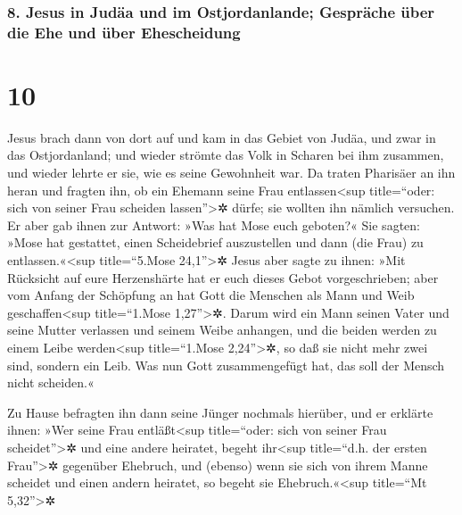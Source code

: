 \hypertarget{jesus-in-juduxe4a-und-im-ostjordanlande-gespruxe4che-uxfcber-die-ehe-und-uxfcber-ehescheidung}{%
\subsubsection{8. Jesus in Judäa und im Ostjordanlande; Gespräche über
die Ehe und über
Ehescheidung}\label{jesus-in-juduxe4a-und-im-ostjordanlande-gespruxe4che-uxfcber-die-ehe-und-uxfcber-ehescheidung}}

\hypertarget{section-9}{%
\section{10}\label{section-9}}

 Jesus brach dann von dort auf und kam in das Gebiet von
Judäa, und zwar in das Ostjordanland; und wieder strömte das Volk in
Scharen bei ihm zusammen, und wieder lehrte er sie, wie es seine
Gewohnheit war.  Da traten Pharisäer an ihn heran und
fragten ihn, ob ein Ehemann seine Frau entlassen\textless sup
title=``oder: sich von seiner Frau scheiden lassen''\textgreater✲ dürfe;
sie wollten ihn nämlich versuchen.  Er aber gab ihnen zur
Antwort: »Was hat Mose euch geboten?«  Sie sagten: »Mose
hat gestattet, einen Scheidebrief auszustellen und dann (die Frau) zu
entlassen.«\textless sup title=``5.Mose 24,1''\textgreater✲
 Jesus aber sagte zu ihnen: »Mit Rücksicht auf eure
Herzenshärte hat er euch dieses Gebot vorgeschrieben; 
aber vom Anfang der Schöpfung an hat Gott die Menschen als Mann und Weib
geschaffen\textless sup title=``1.Mose 1,27''\textgreater✲.
 Darum wird ein Mann seinen Vater und seine Mutter
verlassen und seinem Weibe anhangen,  und die beiden
werden zu einem Leibe werden\textless sup title=``1.Mose
2,24''\textgreater✲, so daß sie nicht mehr zwei sind, sondern ein Leib.
 Was nun Gott zusammengefügt hat, das soll der Mensch
nicht scheiden.«

 Zu Hause befragten ihn dann seine Jünger nochmals
hierüber,  und er erklärte ihnen: »Wer seine Frau
entläßt\textless sup title=``oder: sich von seiner Frau
scheidet''\textgreater✲ und eine andere heiratet, begeht
ihr\textless sup title=``d.h. der ersten Frau''\textgreater✲ gegenüber
Ehebruch,  und (ebenso) wenn sie sich von ihrem Manne
scheidet und einen andern heiratet, so begeht sie
Ehebruch.«\textless sup title=``Mt 5,32''\textgreater✲

